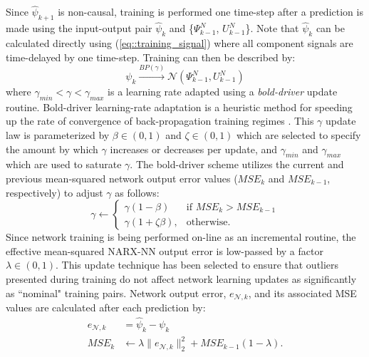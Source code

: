 Since $\hat{\psi}_{k+1}$ is non-causal, training is performed one time-step after a prediction is made using the input-output pair $\hat{\psi}_{k}$ and
\{${\Psi}_{k-1}^{N}$, ${U}_{k-1}^{N}$\}. Note that $\hat{\psi}_{k}$ can be calculated directly using (\ref{eq::training_signal}) where all component
signals are time-delayed by one time-step. Training can then be described by:
	\begin{equation}
		\psi_{k} \xrightarrow{BP(\gamma)} \mathscr{N}({\Psi}_{k-1}^{N},{U}_{k-1}^{N})
		\label{eq::training}
	\end{equation}
where $\gamma _{min} < \gamma < \gamma _{max}$ is a learning rate adapted using a \emph{bold-driver} update routine. Bold-driver learning-rate 
adaptation is a  heuristic method for speeding up the rate of convergence of back-propagation training regimes \cite{Battiti1992,Magoulas1999}. 
This $\gamma$ update law is parameterized by $\beta \in (0,1)$ and $\zeta \in (0,1)$ which are selected to specify the amount by which 
$\gamma$ increases or decreases per update, and $\gamma _{min}$ and $\gamma _{max}$ which are used to saturate $\gamma$.  The bold-driver 
scheme utilizes the current and previous mean-squared network output error values ($MSE_{k}$ and $MSE_{k-1}$, respectively) to adjust $\gamma$ as follows:
	\begin{equation}
	    \gamma \leftarrow 
		\begin{cases}
	    \gamma (1- \beta) 		& \text{if } MSE_{k} > MSE_{k-1}\\
	    \gamma (1+\zeta \beta),& \text{otherwise}.
		\end{cases}
	\end{equation}
Since network training is being performed on-line as an incremental routine, the effective mean-squared NARX-NN  output error 
 is low-passed by a factor $\lambda \in (0,1)$. This update technique has been selected to ensure that outliers presented during 
training do not affect network learning updates as significantly as ``nominal" training pairs. Network output error, 
$e_{\mathscr{N},k}$, and its associated MSE values are calculated after each prediction by:
	\begin{equation}
		\begin{split}
		e_{\mathscr{N},k} 	&= \hat{\psi}_{k} - \psi_{k} \\
		MSE_{k} 			&\leftarrow \lambda \|e_{\mathscr{N},k}\|_{2}^{2} + MSE_{k-1}(1-\lambda).
		\end{split}
	\end{equation}


